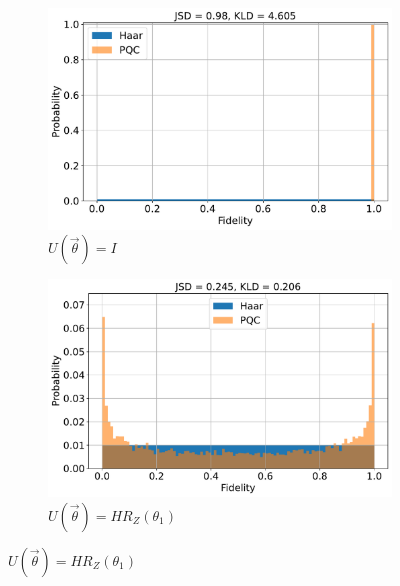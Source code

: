 \documentclass[10pt]{extarticle}
\begin{document}
\begin{figure}[htp]
    \centering
    \begin{subfigure}[b]{0.45\linewidth}
        \includegraphics[width=\linewidth]{expr/expr-hist-1.pdf}
        \caption{$U(\vec{\theta}) = I $ \label{fig:error-chain}}
    \end{subfigure}
    \begin{subfigure}[b]{0.45\linewidth}
        \includegraphics[width=\textwidth]{expr/expr-hist-2.pdf}
        \caption{$U(\vec{\theta}) = H R_{Z} (
        \theta_1)$ \label{fig:edge-graph}}
    \end{subfigure}

\end{figure}
\end{document}
